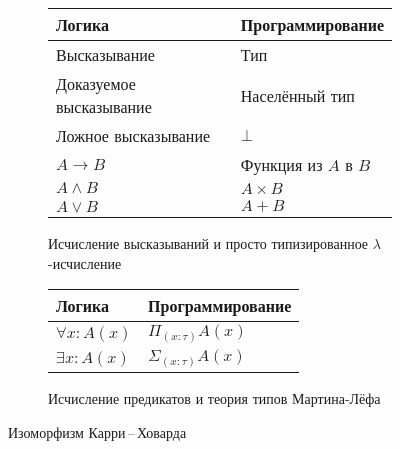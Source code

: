 \begin{figure}
  \centering
  \begin{subfigure}[b]{0.55\textwidth}
    \centering
    \begin{tabular}{|l|l|}
      \hline
      \textbf{Логика} & \textbf{Программирование} \\
      \hline
      Высказывание & Тип \\
      \hline
      Доказуемое высказывание & Населённый тип \\
      \hline
      Ложное высказывание & $\bot$ \\
      \hline
      $A \to B$ & Функция из $A$ в $B$ \\
      \hline
      $A \wedge B$ & $A \times B$ \\
      \hline
      $A \vee B$ & $A + B$ \\
      \hline
    \end{tabular}
    \caption{Исчисление высказываний и просто типизированное
      $\lambda$-исчисление}
    \label{fig:curry-howard-int}
  \end{subfigure}
  \begin{subfigure}[b]{0.4\textwidth}
    \centering
    \begin{tabular}{|l|l|}
      \hline
      \textbf{Логика} & \textbf{Программирование} \\
      \hline
      $\forall x : A(x)$ & $\Pi_{(x:\tau)} A(x)$ \\
      \hline
      $\exists x : A(x)$ & $\Sigma_{(x:\tau)} A(x)$\\
      \hline
    \end{tabular}
    \caption{Исчисление предикатов и теория типов Мартина-Лёфа}
    \label{fig:curry-howard-mltt}
  \end{subfigure}
  \caption{Изоморфизм Карри\,--\,Ховарда}
\end{figure}
